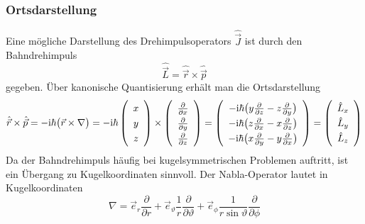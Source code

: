 \documentclass[9pt]{report}
\begin{document}
\subsubsection{Ortsdarstellung}
Eine mögliche Darstellung des Drehimpulsoperators $\hat{\vec{J}}$ ist durch den Bahndrehimpuls
\begin{equation}
\hat{\vec{L}}=\hat{\vec{r}}\times\hat{\vec{p}}\label{Angular momentum}
\end{equation}
gegeben. Über kanonische Quantisierung erhält man die Ortsdarstellung
\begin{equation}
\hat{\vec{r}}\times\hat{\vec{p}}=-\mathrm{i}\hbar\big(\vec{r}\times\nabla\big)=-\mathrm{i}\hbar\renewcommand{\arraystretch}{1.3}\left(\begin{array}{c}x\\y\\z\\\end{array}\right)\times\renewcommand{\arraystretch}{1.3}\left(\begin{array}{c}\frac{\partial}{\partial x}\\\frac{\partial}{\partial y}\\\frac{\partial}{\partial z}\\\end{array}\right)=\renewcommand{\arraystretch}{1.3}\left(\begin{array}{c}-\mathrm{i}\hbar\big(y\frac{\partial}{\partial z}-z\frac{\partial}{\partial y}\big)\\-\mathrm{i}\hbar\big(z\frac{\partial}{\partial x}-x\frac{\partial}{\partial z}\big)\\-\mathrm{i}\hbar\big(x\frac{\partial}{\partial y}-y\frac{\partial}{\partial x}\big)\\\end{array}\right)=\renewcommand{\arraystretch}{1.3}\left(\begin{array}{c}\hat{L}_x\\\hat{L}_y\\\hat{L}_z\\\end{array}\right)
\end{equation}
Da der Bahndrehimpuls häufig bei kugelsymmetrischen Problemen auftritt, ist ein Übergang zu Kugelkoordinaten sinnvoll. Der Nabla-Operator lautet in Kugelkoordinaten
\begin{equation}
\nabla=\vec{e}_{r}\frac{\partial}{\partial r}+\vec{e}_{\vartheta}\frac{1}{r}\frac{\partial}{\partial\vartheta}+\vec{e}_{\phi}\frac{1}{r\sin\vartheta}\frac{\partial}{\partial\phi}\label{Nabla-Operator}
\end{equation}
\end{document}
